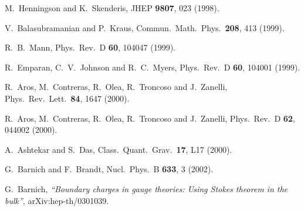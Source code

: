\documentclass[a4paper,12pt]{article}
\begin{document}
\begin{thebibliography}{99}
M.~Henningson and K.~Skenderis,
JHEP {\bf 9807}, 023 (1998).




  V.~Balasubramanian and P.~Kraus, 
Commun.\ Math.\ Phys.\ \textbf{208}, 413 (1999). 


  R.~B.~Mann, %
Phys.\ Rev.\ D \textbf{60}, 104047 (1999). 


  R.~Emparan, C.~V.~Johnson and R.~C.~Myers, 
Phys.\ Rev.\ D \textbf{60}, 104001 (1999). 


  R.~Aros, M.~Contreras, R.~Olea, R.~Troncoso and
J.~Zanelli, 
Phys.\ Rev.\ Lett.\ \textbf{84}, 1647 (2000). 


  R.~Aros, M.~Contreras, R.~Olea, R.~Troncoso and
J.~Zanelli, 
Phys.\ Rev.\ D \textbf{62}, 044002 (2000). 


  A.~Ashtekar and S.~Das, 
Class.\ Quant.\ Grav.\ \textbf{17}, L17 (2000). 


  G.~Barnich and F.~Brandt, 
Nucl.\ Phys.\ B \textbf{633}, 3 (2002). 

G.~Barnich, 
{\it``Boundary charges in gauge theories: Using Stokes theorem in the bulk''},
arXiv:hep-th/0301039.




\end{thebibliography}
\end{document}

